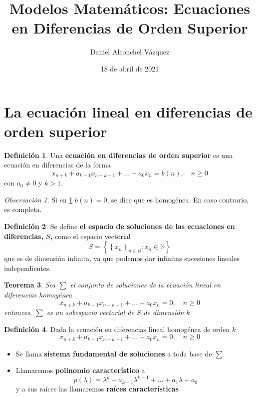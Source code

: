 \documentclass[a4paper, 12pt]{article}
\title{Modelos Matemáticos: Ecuaciones en Diferencias de Orden Superior}
\author{Daniel Alconchel Vázquez}
\date{18 de abril de 2021}
\theoremstyle{plain}
\newtheorem{teorema}{Teorema}[section]
\theoremstyle{definition}
\newtheorem{definicion}[teorema]{Definición}
\theoremstyle{remark}
\newtheorem*{observacion}{Observación}
\begin{document}
	\maketitle
	\newpage
	\tableofcontents
	\newpage
	
	\section{La ecuación lineal en diferencias de orden superior}
	\begin{definicion}\label{ecuacion}
		Una \textbf{ecuación en diferencias de orden superior} es una ecuación en diferencias de la forma
		\[x_{n+k}+a_{k-1}x_{n+k-1}+...+a_0x_n=b(n), \quad n\geq 0\]
		con $a_0 \neq 0$ y $k>1$.
	\end{definicion}

	\begin{observacion}
		Si en \ref{ecuacion} $b(n) = 0$, se dice que es homogénea. En caso contrario, es completa.
	\end{observacion}
	
	\begin{definicion}\label{espacio}
		Se define \textbf{el espacio de soluciones de las ecuaciones en diferencias, $S$,} como el espacio vectorial
		\[S=\left\{\left\{x_n\right\}_{n\in \mathbb{N}}:x_n \in \mathbb{K}\right\}\]
		que es de dimensión infinita, ya que podemos dar infinitas sucesiones lineales independientes.
	\end{definicion}

	\begin{teorema}\label{sum}
		Sea $\sum$ el conjunto de soluciones de la ecuación lineal en diferencias homogénea
		\[x_{n+k}+a_{k-1}x_{n+k-1}+...+a_0x_n=0, \quad n\geq 0\]
		entonces, $\sum$ es un subespacio vectorial de $S$ de dimensión $k$
	\end{teorema}

	\begin{definicion}\label{sol}
		Dada la ecuación en diferencias lineal homogénea de orden $k$ 
		\[x_{n+k}+a_{k-1}x_{n+k-1}+...+a_0x_n=0, \quad n\geq 0\]
		\begin{itemize}
			\item Se llama \textbf{sistema fundamental de soluciones} a toda base de $\sum$
			\item Llamaremos \textbf{polinomio característico} a 
			\[p(\lambda)=\lambda^k+a_{k-1}\lambda^{k-1}+...+a_1\lambda+a_0\]
			y a sus raíces las llamaremos \textbf{raíces características}
		\end{itemize}
	\end{definicion}
\end{document}
